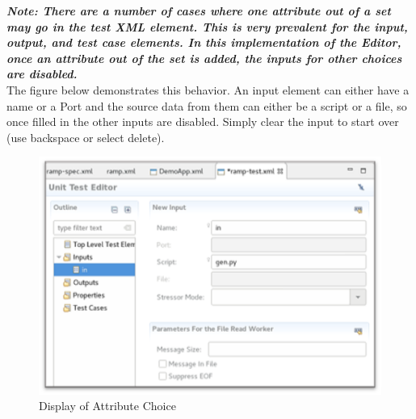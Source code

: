 \documentclass[10pt, a4paper, oneside]{article}
\begin{document}
\textbf{\emph{Note: There are a number of cases where one attribute out of a set may go in the test XML element. This is very prevalent for the input, output, and test case elements. In this implementation of the Editor, once an attribute out of the set is added, the inputs for other choices are disabled.}}\\

The figure below demonstrates this behavior. An input element can either have a name or a Port and the source data from them can either be a script or a file, so once filled in the other inputs are disabled. Simply clear the input to start over (use backspace or select delete).\\
\begin{figure}[h!]
	\centering
	\caption{Display of Attribute Choice}{}
	\includegraphics[width=.65\textwidth]{DisplayofAttributeChoice.png}
 \end{figure}
\end{document}
